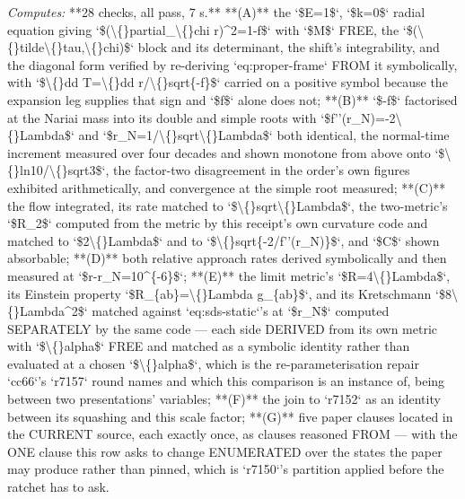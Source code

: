 \begin{description}
\emph{Computes:} **28 checks, all pass, 7 s.** **(A)** the `\$E=1\$`, `\$k=0\$` radial equation giving `\$(\textbackslash\{\}partial\_\textbackslash\{\}chi r)\textasciicircum{}2=1-f\$` with `\$M\$` FREE, the `\$(\textbackslash\{\}tilde\textbackslash\{\}tau,\textbackslash\{\}chi)\$` block and its determinant, the shift's integrability, and the diagonal form verified by re-deriving `eq:proper-frame` FROM it symbolically, with `\$\textbackslash\{\}dd T=\textbackslash\{\}dd r/\textbackslash\{\}sqrt\{-f\}\$` carried on a positive symbol because the expansion leg supplies that sign and `\$f\$` alone does not; **(B)** `\$-f\$` factorised at the Nariai mass into its double and simple roots with `\$f''(r\_N)=-2\textbackslash\{\}Lambda\$` and `\$r\_N=1/\textbackslash\{\}sqrt\textbackslash\{\}Lambda\$` both identical, the normal-time increment measured over four decades and shown monotone from above onto `\$\textbackslash\{\}ln10/\textbackslash\{\}sqrt3\$`, the factor-two disagreement in the order's own figures exhibited arithmetically, and convergence at the simple root measured; **(C)** the flow integrated, its rate matched to `\$\textbackslash\{\}sqrt\textbackslash\{\}Lambda\$`, the two-metric's `\$R\_2\$` computed from the metric by this receipt's own curvature code and matched to `\$2\textbackslash\{\}Lambda\$` and to `\$\textbackslash\{\}sqrt\{-2/f''(r\_N)\}\$`, and `\$C\$` shown absorbable; **(D)** both relative approach rates derived symbolically and then measured at `\$r-r\_N=10\textasciicircum{}\{-6\}\$`; **(E)** the limit metric's `\$R=4\textbackslash\{\}Lambda\$`, its Einstein property `\$R\_\{ab\}=\textbackslash\{\}Lambda g\_\{ab\}\$`, and its Kretschmann `\$8\textbackslash\{\}Lambda\textasciicircum{}2\$` matched against `eq:sds-static`'s at `\$r\_N\$` computed SEPARATELY by the same code --- each side DERIVED from its own metric with `\$\textbackslash\{\}alpha\$` FREE and matched as a symbolic identity rather than evaluated at a chosen `\$\textbackslash\{\}alpha\$`, which is the re-parameterisation repair `cc66`'s `r7157` round names and which this comparison is an instance of, being between two presentations' variables; **(F)** the join to `r7152` as an identity between its squashing and this scale factor; **(G)** five paper clauses located in the CURRENT source, each exactly once, as clauses reasoned FROM --- with the ONE clause this row asks to change ENUMERATED over the states the paper may produce rather than pinned, which is `r7150`'s partition applied before the ratchet has to ask.

\end{description}
